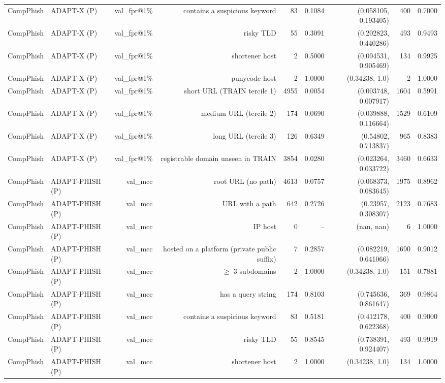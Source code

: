 \begin{table}[t]
\begin{tabular}{llrrrrrrr}
CompPhish & ADAPT-X (P) & val\_fpr@1\% & contains a suspicious keyword & 83 & 0.1084 & (0.058105, 0.193405) & 400 & 0.7000 \\
CompPhish & ADAPT-X (P) & val\_fpr@1\% & risky TLD & 55 & 0.3091 & (0.202823, 0.440286) & 493 & 0.9493 \\
CompPhish & ADAPT-X (P) & val\_fpr@1\% & shortener host & 2 & 0.5000 & (0.094531, 0.905469) & 134 & 0.9925 \\
CompPhish & ADAPT-X (P) & val\_fpr@1\% & punycode host & 2 & 1.0000 & (0.34238, 1.0) & 2 & 1.0000 \\
CompPhish & ADAPT-X (P) & val\_fpr@1\% & short URL (TRAIN tercile 1) & 4955 & 0.0054 & (0.003748, 0.007917) & 1604 & 0.5991 \\
CompPhish & ADAPT-X (P) & val\_fpr@1\% & medium URL (tercile 2) & 174 & 0.0690 & (0.039888, 0.116664) & 1529 & 0.6109 \\
CompPhish & ADAPT-X (P) & val\_fpr@1\% & long URL (tercile 3) & 126 & 0.6349 & (0.54802, 0.713837) & 965 & 0.8383 \\
CompPhish & ADAPT-X (P) & val\_fpr@1\% & registrable domain unseen in TRAIN & 3854 & 0.0280 & (0.023264, 0.033722) & 3460 & 0.6633 \\
CompPhish & ADAPT-PHISH (P) & val\_mcc & root URL (no path) & 4613 & 0.0757 & (0.068373, 0.083645) & 1975 & 0.8962 \\
CompPhish & ADAPT-PHISH (P) & val\_mcc & URL with a path & 642 & 0.2726 & (0.23957, 0.308307) & 2123 & 0.7683 \\
CompPhish & ADAPT-PHISH (P) & val\_mcc & IP host & 0 & -- & (nan, nan) & 6 & 1.0000 \\
CompPhish & ADAPT-PHISH (P) & val\_mcc & hosted on a platform (private public suffix) & 7 & 0.2857 & (0.082219, 0.641066) & 1690 & 0.9012 \\
CompPhish & ADAPT-PHISH (P) & val\_mcc & $\geq$ 3 subdomains & 2 & 1.0000 & (0.34238, 1.0) & 151 & 0.7881 \\
CompPhish & ADAPT-PHISH (P) & val\_mcc & has a query string & 174 & 0.8103 & (0.745636, 0.861647) & 369 & 0.9864 \\
CompPhish & ADAPT-PHISH (P) & val\_mcc & contains a suspicious keyword & 83 & 0.5181 & (0.412178, 0.622368) & 400 & 0.9000 \\
CompPhish & ADAPT-PHISH (P) & val\_mcc & risky TLD & 55 & 0.8545 & (0.738391, 0.924407) & 493 & 0.9919 \\
CompPhish & ADAPT-PHISH (P) & val\_mcc & shortener host & 2 & 1.0000 & (0.34238, 1.0) & 134 & 1.0000 \\

\end{tabular}
\end{table}
